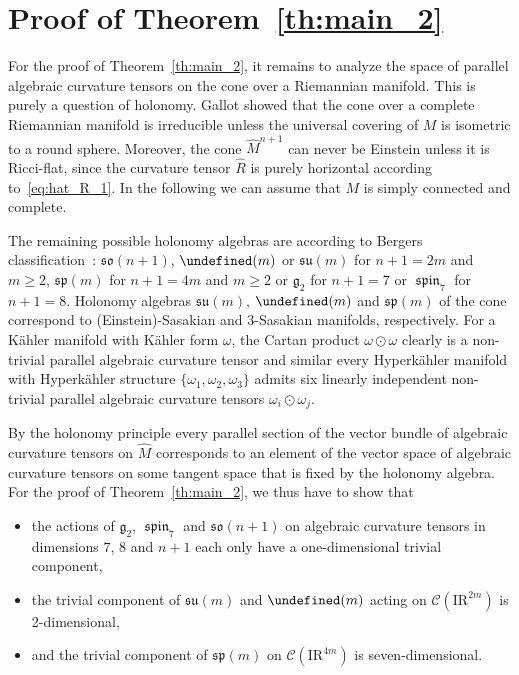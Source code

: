 \documentclass[11pt,a4paper]{article}
\theoremstyle{plain}
\theoremstyle{remark}
\DeclareMathOperator{\spin}{\mathfrak{spin}}
\let\u\undefined \DeclareMathOperator{\u}{\mathfrak{u}}
\newcommand{\so}{\mathfrak{so}}
\newcommand{\su}{\mathfrak{su}}
\renewcommand{\sp}{\mathfrak{sp}}
\newcommand{\R}{\mathrm{I\!R}}
\newcommand{\frakg}{\mathfrak{g}}
\newcommand{\scrC}{\mathcal{C}}
\begin{document}
\section{Proof of Theorem~\ref{th:main_2}}
\label{se:sasaki}
For the proof of Theorem~\ref{th:main_2}, it remains to analyze the space of parallel algebraic curvature tensors on the cone over a Riemannian manifold. 
This is purely a question of holonomy. Gallot showed that the cone over a complete Riemannian manifold is irreducible unless the universal covering of $M$ is isometric to a round sphere. Moreover, the cone $\hat M^{n+1}$ can never be Einstein unless it is Ricci-flat, since the curvature tensor $\hat R$ is purely horizontal according to~\eqref{eq:hat_R_1}. In the following we can assume that $M$ is simply connected and complete. 

The remaining possible holonomy algebras are according to Bergers classification~\cite[5.21]{Ba}: $\so(n + 1)$, $\u(m)$ or $\su(m)$
for $n + 1 = 2 m$ and $m \ge 2$, $\sp(m)$ for $n + 1 = 4 m$ and $m \ge 2$ or $\mathfrak{g}_2$ for $n + 1= 7$
    or $\spin_7$ for $n + 1= 8$.
Holonomy algebras $\su(m)$, $\u(m)$  and  $\sp(m)$ of the cone
correspond to (Einstein)-Sasakian and 3-Sasakian manifolds, respectively.  For a Kähler 
manifold with Kähler form $\omega$, the Cartan product $\omega\odot\omega$
clearly is a non-trivial parallel algebraic curvature tensor and similar every
Hyperkähler manifold with Hyperkähler structure  $\{\omega_1,\omega_2,\omega_3\}$
admits six linearly independent non-trivial parallel algebraic curvature
tensors $\omega_i \odot \omega_j$.

By the holonomy principle every parallel section
of the vector bundle of algebraic curvature tensors
on $\hat M$ corresponds to an element of the vector space of algebraic
curvature tensors on some tangent space that is fixed by the holonomy
algebra. For the proof of Theorem~\ref{th:main_2}, we thus have to show that
\begin{itemize}
\item the actions of $\frakg_2$, $\spin_7$ and  $\so(n+1)$ on algebraic curvature tensors in dimensions $7$, $8$ and $n+1$ each only have a one-dimensional trivial component,
\item the trivial component of $\su(m)$ and $\u(m)$ acting on $\scrC(\R^{2m})$ is 2-dimensional, 
\item and the trivial component of  $\sp(m)$  on $\scrC(\R^{4m})$ is seven-dimensional.
\end{itemize}
\end{document}
